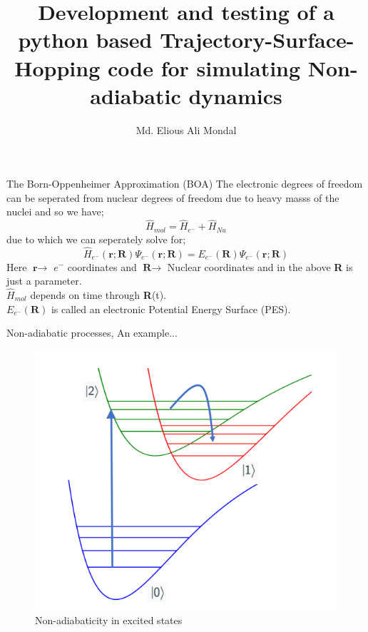 \documentclass{beamer}
\title{Development and testing of a python based Trajectory-Surface-Hopping code for simulating Non-adiabatic dynamics}
\author{Md. Elious Ali Mondal}
\date{}
\begin{document}

	\begin{frame}
	\titlepage
	\end{frame}
	
	\begin{frame}[t]{The Born-Oppenheimer Approximation (BOA)}
	The electronic degrees of freedom can be seperated from nuclear degrees of freedom due to heavy masss of the nuclei and so we have;
	\begin{equation}
	\hat{H}_{mol} = \hat{H}_{e^-} + \hat{H}_{Nu}
	\end{equation}
	due to which we can seperately solve for;
	\begin{equation}
	\hat{H}_{e^-}(\textbf{r};\textbf{R})\Psi_{e^-}(\textbf{r};\textbf{R}) = E_{e^-}(\textbf{R})\Psi_{e^-}(\textbf{r};\textbf{R})
	\end{equation}
	Here $\textbf{r}\rightarrow$ $e^-$ coordinates and $\textbf{R}\rightarrow$ Nuclear coordinates and in the above \textbf{R} is just a parameter.\\ $\hat{H}_{mol}$ depends on time through \textbf{R}(t).\\ $E_{e^-}(\textbf{R})$ is called an electronic Potential Energy Surface (PES).
	\end{frame}	
	
	\begin{frame}[t]{Non-adiabatic processes, An example...}
	\begin{figure}
	\includegraphics[scale=0.50]{NAD.png}
	\caption{Non-adiabaticity in excited states}
	\end{figure}
	\end{frame}
	
\end{document}
